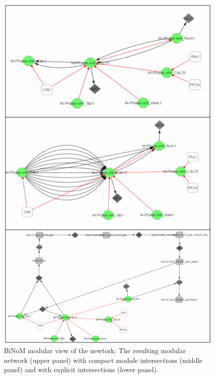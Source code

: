 \begin{figure}
\centering
\includegraphics[width=14 cm]{graphics/Modular_view_The_resulting_modular_network}
\caption{BiNoM modular view of the newtork: The resulting modular network (upper panel) with compact module intersections (middle panel) and with explicit intersections (lower panel).}
\label{Modular_view_The_resulting_modular_network}
\end{figure}
